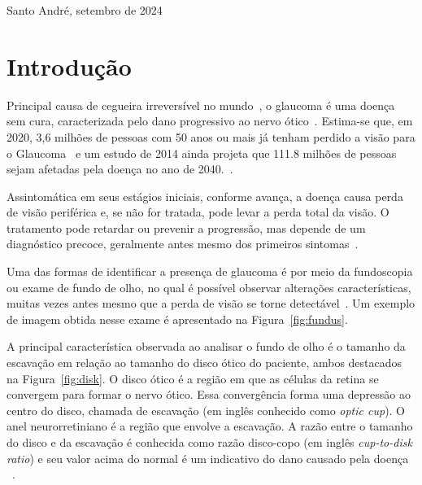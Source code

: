 \documentclass[12pt]{article}
\begin{document}
\begin{center}
Santo André, setembro de 2024
\end{center}

\newpage
\bigskip

\section{Introdução}
\label{sec:introducao}

Principal causa de cegueira irreversível no mundo~\cite{steinmetz_causes_2021}, o glaucoma é uma doença sem cura, caracterizada pelo dano progressivo ao nervo ótico~\cite{who_2019}. Estima-se que, em 2020, 3,6 milhões de pessoas com 50 anos ou mais já tenham perdido a visão para o Glaucoma~\cite{steinmetz_causes_2021} e um estudo de 2014 ainda projeta que 111.8 milhões de pessoas sejam afetadas pela doença no ano de 2040.~\cite{tham_global_2014}.

Assintomática em seus estágios iniciais, conforme avança, a doença causa perda de visão periférica e, se não for tratada, pode levar a perda total da visão. O tratamento pode retardar ou prevenir a progressão, mas depende de um diagnóstico precoce, geralmente antes mesmo dos primeiros sintomas~\cite{who_2019}.

Uma das formas de identificar a presença de glaucoma é por meio da fundoscopia ou exame de fundo de olho, no qual é possível observar alterações características, muitas vezes antes mesmo que a perda de visão se torne detectável~\cite{weinreb_2004}. Um exemplo de imagem obtida nesse exame é apresentado na Figura~\ref{fig:fundus}.

A principal característica observada ao analisar o fundo de olho é o tamanho da escavação em relação ao tamanho do disco ótico do paciente, ambos destacados na Figura~\ref{fig:disk}. O disco ótico é a região em que as células da retina se convergem para formar o nervo ótico. Essa convergência forma uma depressão ao centro do disco, chamada de escavação (em inglês conhecido como \emph{optic cup}). O anel neurorretiniano é a região que envolve a escavação. A razão entre o tamanho do disco e da escavação é conhecida como razão disco-copo (em inglês \emph{cup-to-disk ratio}) e seu valor acima do normal é um indicativo do dano causado pela doença ~\cite{weinreb_2004}. %
\end{document}
